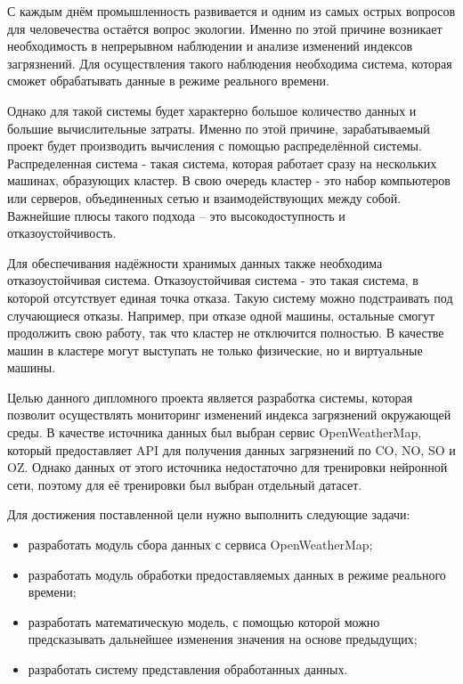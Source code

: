 \label{sec:intro}

С каждым днём промышленность развивается и одним из самых острых вопросов для человечества остаётся вопрос экологии.
Именно по этой причине возникает необходимость в непрерывном наблюдении и анализе изменений индексов загрязнений.
Для осуществления такого наблюдения необходима система, которая сможет обрабатывать данные в режиме реального времени.

Однако для такой системы будет характерно большое количество данных и большие вычислительные затраты.
Именно по этой причине, зарабатываемый проект будет производить вычисления с помощью распределённой системы.
Распределенная система - такая система, которая работает сразу на нескольких машинах, образующих кластер.
В свою очередь кластер - это набор компьютеров или серверов, объединенных сетью и взаимодействующих между собой.
Важнейшие плюсы такого подхода – это высокодоступность и отказоустойчивость.

Для обеспечивания надёжности хранимых данных также необходима отказоустойчивая система. 
Отказоустойчивая система - это такая система, в которой отсутствует единая точка отказа.
Такую систему можно подстраивать под случающиеся отказы.
Например, при отказе одной машины, остальные смогут продолжить свою работу, так что кластер не отключится полностью.
В качестве машин в кластере могут выступать не только физические, но и виртуальные машины.

Целью данного дипломного проекта является разработка системы, которая позволит осуществлять мониторинг изменений индекса загрязнений окружающей среды.
В качестве источника данных был выбран сервис OpenWeatherMap, который предоставляет API для получения данных загрязнений по CO, NO, SO и OZ.
Однако данных от этого источника недостаточно для тренировки нейронной сети, поэтому для её тренировки был выбран отдельный датасет.


Для достижения поставленной цели нужно выполнить следующие задачи:
\begin{itemize}
    \item разработать модуль сбора данных с сервиса OpenWeatherMap;
    \item разработать модуль обработки предоставляемых данных в режиме реального времени;
    \item разработать математическую модель, с помощью которой можно предсказывать дальнейшее изменения значения на основе предыдущих;
    \item разработать систему представления обработанных данных.
\end{itemize}

